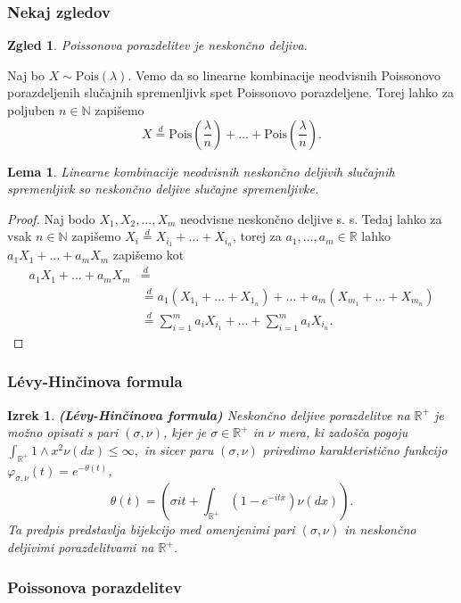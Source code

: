 \documentclass[]{beamer} %
\theoremstyle{plain}
\newtheorem{izrek}{Izrek}
\newtheorem{zgled}{Zgled}
\newtheorem{lema}{Lema}
\begin{document}
\begin{frame}
  \frametitle{Nekaj zgledov}
  \begin{zgled}
    Poissonova porazdelitev je neskončno deljiva.
  \end{zgled}
  \begin{center}
    Naj bo $X \sim \text{Pois}(\lambda)$. Vemo da so linearne kombinacije neodvisnih Poissonovo
    porazdeljenih slučajnih spremenljivk spet Poissonovo porazdeljene. Torej lahko za poljuben 
    $n\in\mathbb{N}$ zapišemo
    $$
      X \stackrel{d}{=} \text{Pois}(\frac{\lambda}{n}) + \dots + \text{Pois}(\frac{\lambda}{n}).
    $$
  \end{center}
\end{frame}

\begin{frame}
  \begin{lema}
    Linearne kombinacije neodvisnih neskončno deljivih slučajnih spremenljivk so neskončno deljive slučajne spremenljivke.
\end{lema}


\begin{proof}
    Naj bodo $X_1, X_2, ..., X_m$ neodvisne neskončno deljive s. s. Tedaj lahko za vsak $n \in \mathbb{N}$ 
    zapišemo $X_i \stackrel{d}{=} X_{i_1} + \dots + X_{i_n}$, torej za
    $a_1, \dots, a_m \in \mathbb{R}$ lahko $a_1X_1 + \dots + a_mX_m$ zapišemo kot 
    \begin{align*}
        a_1X_1 + \dots + a_mX_m &\stackrel{d}{=} \\
                                &\stackrel{d}{=} a_1(X_{1_1} + \dots + X_{1_n}) + \dots + a_m(X_{m_1} + \dots + X_{m_n}) \\
                                &\stackrel{d}{=} \sum_{i=1}^ma_iX_{i_1} + \dots + \sum_{i=1}^ma_iX_{i_n}.
    \end{align*}
\end{proof}
\end{frame}


\begin{frame}
  \frametitle{Lévy-Hinčinova formula}
  \begin{izrek}
    \textbf{(Lévy-Hinčinova formula)} 
    Neskončno deljive porazdelitve na $\mathbb{R}^+$ je možno opisati s pari $(\sigma, \nu)$, kjer je 
    $\sigma \in \mathbb{R}^+$ in $\nu$ mera, ki zadošča pogoju $\int_{\mathbb{R}^+}1 \wedge x^2 \nu(dx)\leq \infty,$
    in sicer paru $(\sigma, \nu)$ priredimo karakteristično funkcijo $\varphi_{\sigma, \nu}(t) = e^{-\theta(t)}$,
    $$
    \theta(t) = \left(\sigma i t + \int_{\mathbb{R}^+}(1 - e^{-i t x}) \nu(dx)\right).
    $$
    Ta predpis predstavlja bijekcijo med omenjenimi pari  $(\sigma, \nu)$ in neskončno deljivimi porazdelitvami na $\mathbb{R}^+$.
  \end{izrek}
\end{frame}

\begin{frame}
  \frametitle{Poissonova porazdelitev}
  
\end{frame}
\end{document}
